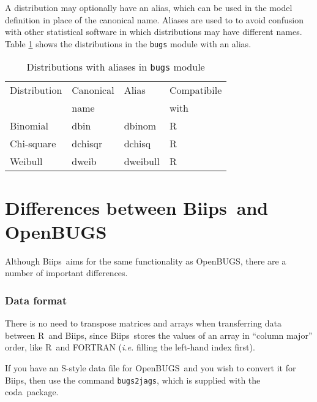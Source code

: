 \documentclass[11pt, a4paper, titlepage]{report}
\newcommand{\biips}{\textsf{Biips}}
\newcommand{\OpenBUGS}{\textsf{OpenBUGS}}
\newcommand{\R}{\textsf{R}}
\newcommand{\CODA}{\textsf{coda}}
\begin{document}
A distribution may optionally have an alias, which can be used in the
model definition in place of the canonical name. Aliases are used to
to avoid confusion with other statistical software in which
distributions may have different names. Table
\ref{table:bugs:distributions:alias} shows the distributions in the
\texttt{bugs} module with an alias.

\begin{table}[h!]
\begin{center}
\begin{tabular}{llll}
\hline
Distribution & Canonical & Alias & Compatibile  \\
             & name      &       & with         \\
\hline
Binomial           & dbin      & dbinom   & R   \\
Chi-square         & dchisqr   & dchisq   & R   \\ 
Weibull            & dweib     & dweibull & R   \\ 
\hline
\end{tabular}
\caption{Distributions with aliases in \texttt{bugs} module
  \label{table:bugs:distributions:alias}}
\end{center}
\end{table}

\chapter{Differences between \biips\ and \OpenBUGS}

Although \biips\ aims for the same functionality as \OpenBUGS, there are
a number of important differences.

\subsection{Data format}

There is no need to transpose matrices and arrays when transferring
data between \R\ and \biips, since \biips\ stores the values of an array
in ``column major'' order, like \R\ and FORTRAN ({\em i.e.} filling
the left-hand index first).

If you have an \textsf{S}-style data file for \OpenBUGS\ and you wish
to convert it for \biips, then use the command \texttt{bugs2jags},
which is supplied with the \CODA\ package.
\end{document}
